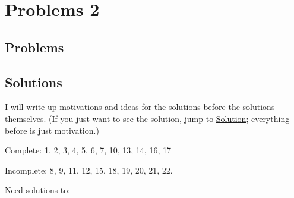 \chapter{Problems 2}

\section{Problems}
\section{Solutions}

I will write up motivations and ideas for the solutions before the solutions themselves. (If you just want to see the solution, jump to \ul{Solution}; everything before is just motivation.)

Complete: 1, 2, 3, 4, 5, 6, 7, 10, 13, 14, 16, 17

Incomplete: 8, 9, 11, 12, 15, 18, 19, 20, 21, 22.

Need solutions to:


